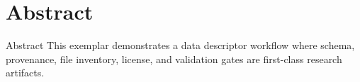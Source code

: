 \documentclass[
  ignorenonframetext,
]{beamer}
\author{\texorpdfstring{}{}}
\date{}
\begin{document}
\section{Abstract}\label{abstract}

\begin{frame}[allowframebreaks]{Abstract}
This exemplar demonstrates a data descriptor workflow where schema,
provenance, file inventory, license, and validation gates are
first-class research artifacts.
\end{frame}
\end{document}
